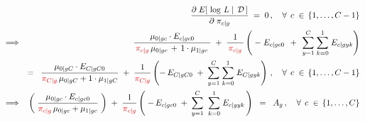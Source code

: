 \begin{eqnarray*}
&&
	\dfrac{\partial\;E\!\left[\,\left.\log\,L\;\right\vert\;\mathcal{D}\,\right]}{\partial\;\pi_{c \vert g}} \;=\; 0\,,
	\quad\forall\;\,c\;\in\,\{1,\ldots,C-1\}
\\
&\Longrightarrow&
	\;{\color{white}=} \;\;
		\dfrac{\mu_{0 \vert gc}\cdot E_{c \vert gc0}}{\mbox{}\,{\color{red}\pi_{c \vert g}}\,\mu_{0 \vert gc} \,+\, 1\cdot\mu_{1\vert gc}\;\mbox{}}
		\;+\;
		\dfrac{1}{\mbox{}\,{\color{red}\pi_{c \vert g}}\,\mbox{}}
		\left(
			\;-\;E_{c \vert gc0}
			\,\;+\;\,
			\overset{C}{\underset{y=1}{\sum}} \; \overset{1}{\underset{k=0}{\sum}} \; E_{c \vert gyk}
		\right)
\\
&&
	= \;\;
		\dfrac{\mu_{0 \vert gC} \cdot E_{C \vert gC0}}{{\color{red}\pi_{C \vert g}}\,\mu_{0 \vert gC}+1\cdot\mu_{1\vert gC}}
		\;+\;
		\dfrac{1}{{\color{red}\pi_{C \vert g}}}
		\left(
			-\,E_{C \vert gC0}
			\;+\;
			\overset{C}{\underset{y=1}{\sum}} \; \overset{1}{\underset{k=0}{\sum}} \; E_{C \vert gyk}
		\right)\,,	
	\quad\forall\;\,c\;\in\,\{1,\ldots,C-1\}
\\
&\Longrightarrow&
		\left(\;
			\dfrac{\mu_{0 \vert gc} \cdot E_{c \vert gc0}}{
				{\color{red}\pi_{c \vert g}}\,\mu_{0 \vert gc} + \mu_{1\vert gc}
				}
		\;\right)
		\; + \;
		\dfrac{1}{\color{red}\pi_{c \vert g}}
		\left(\;
			-\,E_{c \vert gc0}
			\; + \;
			\overset{C}{\underset{y=1}{\sum}}\;\;
			\overset{1}{\underset{k=0}{\sum}}\;
			E_{c \vert gyk}
		\,\right)
		\;\; = \;\;
		A_{g}\,,
		\quad\forall\;\,c\;\in\,\{1,\ldots,C\}
\end{eqnarray*}

